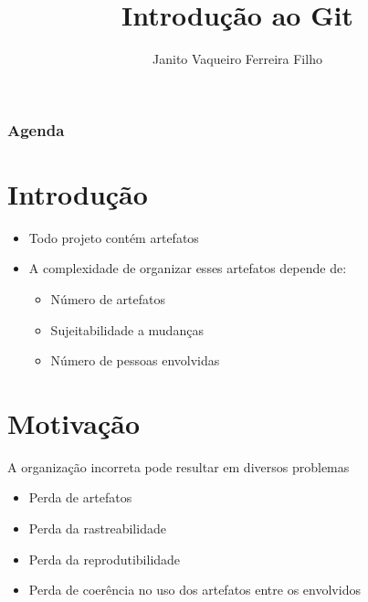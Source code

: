 \documentclass{beamer}
\title{Introdução ao Git}
\author{Janito Vaqueiro Ferreira Filho}
\institute{Universidade Estadual de Campinas}
\newenvironment{slide}{\begin{frame}{\insertsection}}{\end{frame}}
\begin{document}
\begin{frame}
    \titlepage
\end{frame}

\begin{frame}
    \frametitle{Agenda}
    \tableofcontents
\end{frame}

\section{Introdução}
\begin{slide}
    \begin{itemize}
        \item Todo projeto contém artefatos
        \pause
        \item A complexidade de organizar esses artefatos depende de:
        \pause
            \begin{itemize}
                \item Número de artefatos
                \pause
                \item Sujeitabilidade a mudanças
                \pause
                \item Número de pessoas envolvidas
            \end{itemize}
    \end{itemize}
\end{slide}

\section{Motivação}
\begin{slide}
    A organização incorreta pode resultar em diversos problemas
    \begin{itemize}
        \pause
        \item Perda de artefatos
        \pause
        \item Perda da rastreabilidade
        \pause
        \item Perda da reprodutibilidade
        \pause
        \item Perda de coerência no uso dos artefatos entre os envolvidos
    \end{itemize}
\end{slide}
\end{document}
